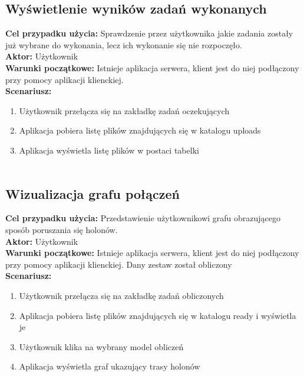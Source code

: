 \subsection{Wyświetlenie wyników zadań wykonanych}
	\textbf{Cel przypadku użycia:} Sprawdzenie przez użytkownika jakie zadania zostały już wybrane do wykonania, lecz ich wykonanie się nie rozpoczęło.\\
	\textbf{Aktor:} Użytkownik\\
	\textbf{Warunki początkowe:} Istnieje aplikacja serwera, klient jest do niej podłączony przy pomocy aplikacji klienckiej.\\
	\textbf{Scenariusz:}
	\begin{enumerate}
	\item Użytkownik przełącza się na zakładkę zadań oczekujących
	\item Aplikacja pobiera listę plików znajdujących się w katalogu uploads
	\item  Aplikacja wyświetla listę plików w postaci tabelki\\\\
	\end{enumerate}
\subsection{Wizualizacja grafu połączeń}
	\textbf{Cel przypadku użycia:} Przedstawienie użytkownikowi grafu obrazującego sposób poruszania się holonów.\\
	\textbf{Aktor:} Użytkownik\\
	\textbf{Warunki początkowe:} Istnieje aplikacja serwera, klient jest do niej podłączony przy pomocy aplikacji klienckiej. Dany zestaw został obliczony\\
	\textbf{Scenariusz:}
	\begin{enumerate}
	\item Użytkownik przełącza się na zakładkę zadań obliczonych
	\item Aplikacja pobiera listę plików znajdujących się w katalogu ready i wyświetla je
	\item Użytkownik klika na wybrany model obliczeń
	\item Aplikacja wyświetla graf ukazujący trasy holonów\\\\
	\end{enumerate}
	

